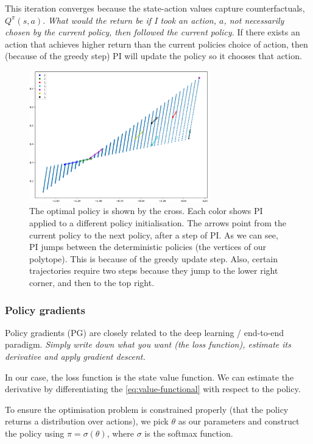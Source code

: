 This iteration converges because the state-action values capture counterfactuals, $Q^{\pi}(s, a)$.
\textit{What would the return be if I took an action, $a$, not necessarily chosen by
the current policy, then followed the current policy.}
If there exists an action that achieves higher return than the current policies choice of action,
then (because of the greedy step) PI will update the policy so it chooses that action.

\begin{figure}[h!]
\centering
\includegraphics[width=0.7\textwidth,height=0.35\textheight]{../../pictures/figures/pi-polytope.png}
\caption{The optimal policy is shown by the cross.
Each color shows PI applied to a different policy initialisation.
The arrows point from the current policy to the next policy, after a step of PI. As we can see,
PI jumps between the deterministic policies (the vertices of our polytope).
This is because of the greedy update step. Also, certain trajectories require two steps
because they jump to the lower right corner, and then to the top right.}
\end{figure}

\subsubsection{Policy gradients}

Policy gradients (PG) are closely related to the deep learning / end-to-end paradigm.
\textit{Simply write down what you want (the loss function),
estimate its derivative and apply gradient descent.}

In our case, the loss function is the state value function. We can estimate the derivative
by differentiating the \ref{eq:value-functional} with respect to the policy.

To ensure the optimisation problem is constrained properly (that the policy returns a distribution over actions),
we pick $\theta$ as our parameters and construct the policy using $\pi = \sigma(\theta)$, where $\sigma$ is the softmax function.

